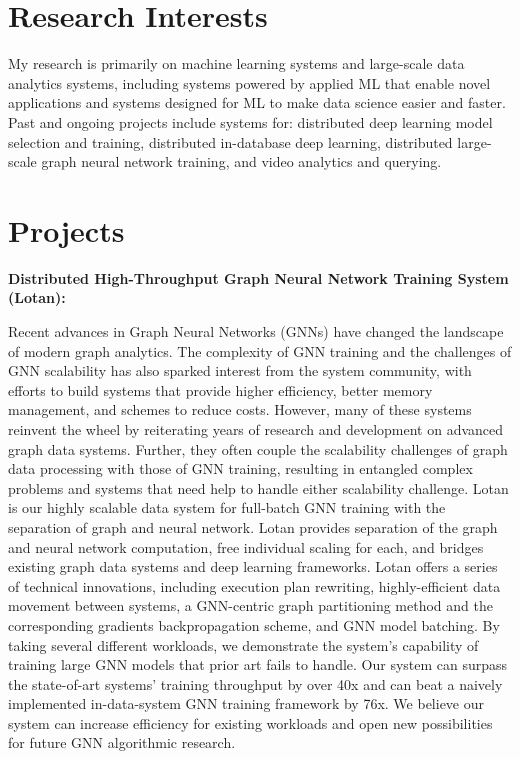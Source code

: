\documentclass[margin,line]{res}
\begin{document}
\begin{resume}
\section{\sc Research Interests}
My research is primarily on machine learning systems and large-scale data analytics systems, including systems powered by applied ML that enable novel applications and systems designed for ML to make data science easier and faster. Past and ongoing projects include systems for: distributed deep learning model selection and training, distributed in-database deep learning, distributed large-scale graph neural network training, and video analytics and querying.

\section{\sc Projects}
{\bf Distributed High-Throughput Graph Neural Network Training System (Lotan):}

Recent advances in Graph Neural Networks (GNNs) have changed the landscape of modern graph analytics. The complexity of GNN training and the challenges of GNN scalability has also sparked interest from the system community, with efforts to build systems that provide higher efficiency, better memory management, and schemes to reduce costs. However, many of these systems reinvent the wheel by reiterating years of research and development on advanced graph data systems. Further, they often couple the scalability challenges of graph data processing with those of GNN training, resulting in entangled complex problems and systems that need help to handle either scalability challenge. Lotan is our highly scalable data system for full-batch GNN training with the separation of graph and neural network. Lotan provides separation of the graph and neural network computation, free individual scaling for each, and bridges existing graph data systems and deep learning frameworks. Lotan offers a series of technical innovations, including execution plan rewriting, highly-efficient data movement between systems, a GNN-centric graph partitioning method and the corresponding gradients backpropagation scheme, and GNN model batching. By taking several different workloads, we demonstrate the system's capability of training large GNN models that prior art fails to handle. Our system can surpass the state-of-art systems' training throughput by over 40x and can beat a naively implemented in-data-system GNN training framework by 76x. We believe our system can increase efficiency for existing workloads and open new possibilities for future GNN algorithmic research.


\end{resume}
\end{document}
